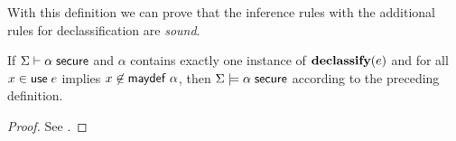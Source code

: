 \documentclass[11pt]{article}
\begin{document}
With this definition we can prove that the inference rules with the additional
rules for declassification are \emph{sound}.
\begin{theorem}
  If $\Sigma \vdash \alpha\; \mathsf{secure}$ and $\alpha$ contains
  exactly one instance of $\mathbf{declassify}(e)$ and for all $x \in \mathsf{use}\; e$
  implies $x \not\in \mathsf{maydef}\; \alpha$, then $\Sigma \models \alpha\; \mathsf{secure}$
  according to the preceding definition.
\end{theorem}
\begin{proof}
  See \citet{Sabelfeld03isss}.
\end{proof}



\end{document}
